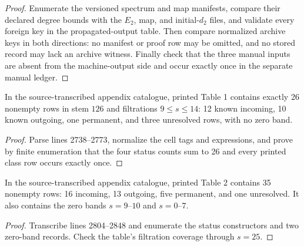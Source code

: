 \begin{proof}
  Enumerate the versioned spectrum and map manifests, compare their declared
  degree bounds with the $E_2$, map, and initial-$d_2$ files, and validate every
  foreign key in the propagated-output table.  Then compare normalized archive
  keys in both directions: no manifest or proof row may be omitted, and no
  stored record may lack an archive witness.  Finally check that the three
  manual inputs are absent from the machine-output side and occur exactly once
  in the separate manual ledger.
\end{proof}



\begin{proposition}
  \label{data:table-cnu126}
  \notready
  In the source-transcribed appendix catalogue, printed Table 1 contains exactly 26
  nonempty rows in stem $126$ and filtrations
  $9\le s\le14$: 12 known incoming, 10 known outgoing, one permanent, and
  three unresolved rows, with no zero band.
\end{proposition}

\begin{proof}
  Parse lines 2738--2773, normalize the cell tags and expressions, and prove
  by finite enumeration that the four status counts sum to 26 and every
  printed class row occurs exactly once.
\end{proof}

\begin{proposition}
  \label{data:table-s122}
  \notready
  In the source-transcribed appendix catalogue, printed Table 2 contains 35 nonempty
  rows: 16 incoming, 13 outgoing, five permanent, and one unresolved.  It also
  contains the zero bands $s=9$--$10$ and $s=0$--$7$.
\end{proposition}

\begin{proof}
  Transcribe lines 2804--2848 and enumerate the status constructors and two
  zero-band records.  Check the table's filtration coverage through $s=25$.
\end{proof}

